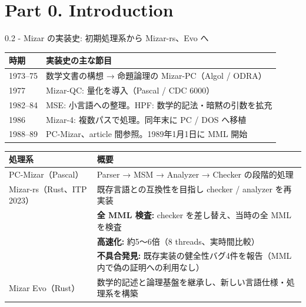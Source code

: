 \documentclass[dvipdfmx,aspectratio=169,11pt]{beamer}
\begin{document}
\section{Part 0. Introduction}
\begin{frame}[fragile,t]{0.2 - Mizar の実装史: 初期処理系から Mizar-rs、Evo へ}
\par{}
\begin{footnotesize}
\setlength{\tabcolsep}{3pt}
\renewcommand{\arraystretch}{1.15}
\renewcommand{\arraystretch}{0.93}
\begin{tabularx}{\textwidth}{l>{\raggedright\arraybackslash}X}
\toprule
\textbf{時期} & \textbf{実装史の主な節目} \\
\midrule
1973–75 & 数学文書の構想 → 命題論理の Mizar-PC（Algol / ODRA） \\
1977 & Mizar-QC: 量化を導入（Pascal / CDC 6000） \\
1982–84 & MSE: 小言語への整理。HPF: 数学的記法・暗黙の引数を拡充 \\
1986 & Mizar-4: 複数パスで処理。同年末に PC / DOS へ移植 \\
1988–89 & PC-Mizar、article 間参照。1989年1月1日に MML 開始 \\
\bottomrule
\end{tabularx}
\end{footnotesize}

\par{}
\begin{footnotesize}
\setlength{\tabcolsep}{3pt}
\renewcommand{\arraystretch}{1.15}
\renewcommand{\arraystretch}{0.93}
\begin{tabularx}{\textwidth}{l>{\raggedright\arraybackslash}X}
\toprule
\textbf{処理系} & \textbf{概要} \\
\midrule
PC-Mizar（Pascal） & Parser → MSM → Analyzer → Checker の段階的処理 \\
Mizar-rs（Rust、ITP 2023） & 既存言語との互換性を目指し checker / analyzer を再実装 \\
 & \textcolor{blue!55!black}{\textbf{全 MML 検査:}} checker を差し替え、当時の全 MML を検査 \\
 & \textcolor{blue!55!black}{\textbf{高速化:}} 約5〜6倍（8 threads、実時間比較） \\
 & \textcolor{blue!55!black}{\textbf{不具合発見:}} 既存実装の健全性バグ4件を報告（MML 内で偽の証明への利用なし） \\
Mizar Evo（Rust） & 数学的記述と論理基盤を継承し、新しい言語仕様・処理系を構築 \\
\bottomrule
\end{tabularx}
\end{footnotesize}


\end{frame}
\end{document}
